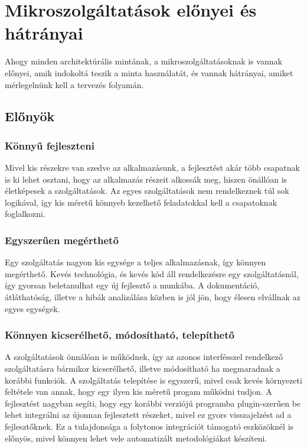 \documentclass[11pt,magyar,a4paper,twoside,]{report}
\begin{document}
\section{Mikroszolgáltatások előnyei és
hátrányai}\label{mikroszolguxe1ltatuxe1sok-elux151nyei-uxe9s-huxe1truxe1nyai}

Ahogy minden architektúrális mintának, a mikroszolgáltatásoknak is
vannak előnyei\citep{microservices}, amik indokoltá teszik a minta
használatát, és vannak hátrányai\citep{micro-disadv}, amiket
mérlegelnünk kell a tervezés folyamán.

\subsection{Előnyök}\label{elux151nyuxf6k}

\subsubsection{Könnyű fejleszteni}\label{kuxf6nnyux171-fejleszteni}

Mivel kis részekre van szedve az alkalmazásunk, a fejlesztést akár több
csapatnak is ki lehet osztani, hogy az alkalmazás részeit alkossák meg,
hiszen önállóan is életképesek a szolgáltatások. Az egyes szolgáltatások
nem rendelkeznek túl sok logikával, így kis méretű könnyeb kezelhető
feladatokkal kell a csapatoknak foglalkozni.

\subsubsection{Egyszerűen
megérthető}\label{egyszerux171en-meguxe9rthetux151}

Egy szolgáltatás nagyon kis egysége a teljes alkalmazásnak, így könnyen
megérthető. Kevés technológia, és kevés kód áll rendelkezésre egy
szolgáltatásnál, így gyorsan beletanulhat egy új fejlesztő a munkába. A
dokumentáció, átláthatóság, illetve a hibák analizálása közben is jól
jön, hogy élesen elvállnak az egyes egységek.

\subsubsection{Könnyen kicserélhető, módosítható,
telepíthető}\label{kuxf6nnyen-kicseruxe9lhetux151-muxf3dosuxedthatuxf3-telepuxedthetux151}

A szolgáltatások önnálóan is működnek, így az azonos interfésszel
rendelkező szolgáltatásra bármikor kicserélhető, illetve módosítható ha
megmaradnak a korábbi funkciók. A szolgáltatás telepítése is egyszerű,
mivel csak kevés környezeti feltétele van annak, hogy egy ilyen kis
méretű progam működni tudjon. A fejlesztést nagyban segíti, hogy egy
korábbi verziójú programba plugin-szerűen be lehet integrálni az újonnan
fejlesztett részeket, mivel ez gyors visszajelzést ad a fejlesztőknek.
Ez a tulajdonsága a folytonos integrációt támogató eszközöknél is
előnyös, mivel könnyen lehet vele automatizált metodológiákat készíteni.
\end{document}
